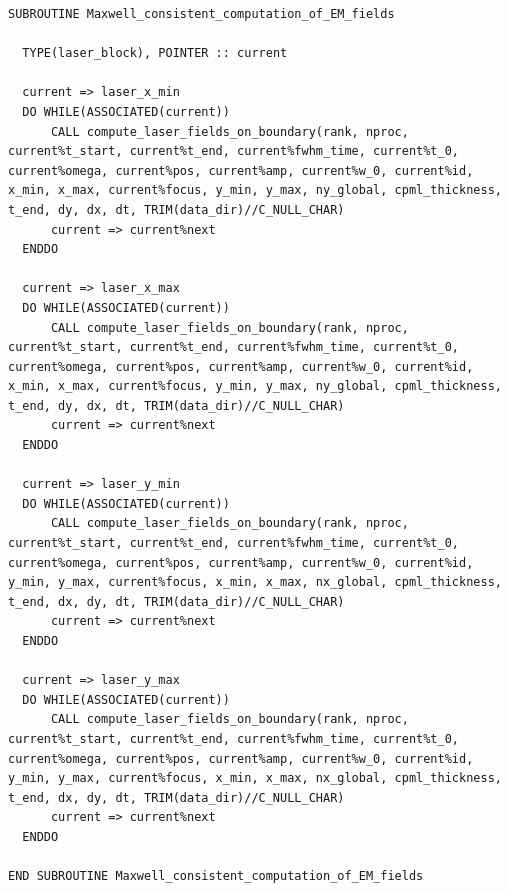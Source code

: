 \begin{lstlisting}[style=FORTRAN, caption=Fortran subroutines for Maxwell consistent computation of laser fields on boundaries]
SUBROUTINE Maxwell_consistent_computation_of_EM_fields
  
  TYPE(laser_block), POINTER :: current
  
  current => laser_x_min
  DO WHILE(ASSOCIATED(current))
	  CALL compute_laser_fields_on_boundary(rank, nproc, current%t_start, current%t_end, current%fwhm_time, current%t_0, current%omega, current%pos, current%amp, current%w_0, current%id, x_min, x_max, current%focus, y_min, y_max, ny_global, cpml_thickness, t_end, dy, dx, dt, TRIM(data_dir)//C_NULL_CHAR)
	  current => current%next
  ENDDO
  
  current => laser_x_max
  DO WHILE(ASSOCIATED(current))
	  CALL compute_laser_fields_on_boundary(rank, nproc, current%t_start, current%t_end, current%fwhm_time, current%t_0, current%omega, current%pos, current%amp, current%w_0, current%id, x_min, x_max, current%focus, y_min, y_max, ny_global, cpml_thickness, t_end, dy, dx, dt, TRIM(data_dir)//C_NULL_CHAR)
	  current => current%next
  ENDDO
  
  current => laser_y_min
  DO WHILE(ASSOCIATED(current))
	  CALL compute_laser_fields_on_boundary(rank, nproc, current%t_start, current%t_end, current%fwhm_time, current%t_0, current%omega, current%pos, current%amp, current%w_0, current%id, y_min, y_max, current%focus, x_min, x_max, nx_global, cpml_thickness, t_end, dx, dy, dt, TRIM(data_dir)//C_NULL_CHAR)
	  current => current%next
  ENDDO
  
  current => laser_y_max
  DO WHILE(ASSOCIATED(current))
	  CALL compute_laser_fields_on_boundary(rank, nproc, current%t_start, current%t_end, current%fwhm_time, current%t_0, current%omega, current%pos, current%amp, current%w_0, current%id, y_min, y_max, current%focus, x_min, x_max, nx_global, cpml_thickness, t_end, dx, dy, dt, TRIM(data_dir)//C_NULL_CHAR)
	  current => current%next
  ENDDO
  
END SUBROUTINE Maxwell_consistent_computation_of_EM_fields
\end{lstlisting}

